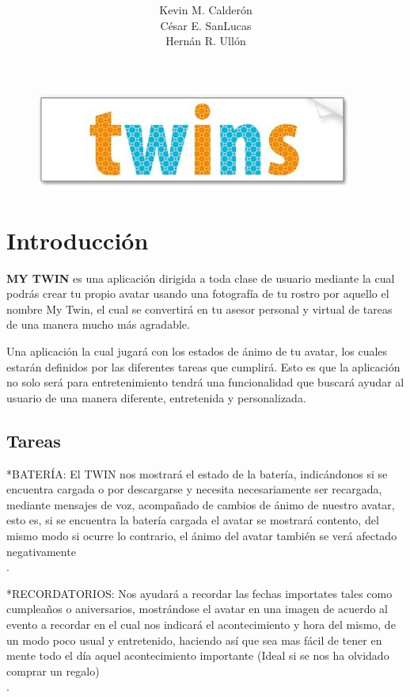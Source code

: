 \documentclass[12pt]{article}
\title{{\LARGE \textbf{\color{blue}{MY TWIN}}}}
\author{Kevin M. Calder\'on\\C\'esar E. SanLucas\\Hern\'an R. Ull\'on}
\date{}
\begin{document}
\maketitle

\begin{figure}[h]
\centering
\includegraphics[scale=0.5]{LTwins}     %
\end{figure}

\newpage
\section{Introducción} 

\textbf{MY TWIN} es una aplicación dirigida a toda clase de usuario mediante la cual podrás crear tu propio avatar usando una fotografía de tu rostro por aquello el nombre My Twin, el cual se convertirá en tu asesor personal y virtual de tareas de una manera mucho más agradable. 

Una aplicación la cual jugará con los estados de ánimo de tu avatar, los cuales estarán definidos por las diferentes tareas que cumplirá. Esto es que la aplicación no solo será para entretenimiento tendrá una funcionalidad que buscará ayudar al usuario de una manera diferente, entretenida y personalizada.\\
\subsection{Tareas} 

\hspace{0.2in}*BATERÍA: El TWIN  nos  mostrará el estado de la batería, indicándonos si se encuentra cargada o por descargarse y necesita necesariamente ser recargada, mediante mensajes de voz, acompañado de cambios de ánimo de nuestro avatar, esto es, si se encuentra la batería cargada el avatar se mostrará contento, del mismo modo si ocurre lo contrario, el ánimo del avatar también se verá afectado negativamente\\. 

\hspace{0.2in}*RECORDATORIOS: Nos ayudará a recordar las fechas importates tales como cumpleaños o aniversarios, mostrándose el avatar en una imagen de acuerdo al evento a recordar en el cual nos indicará el acontecimiento y hora del mismo, de un modo poco usual y entretenido, haciendo así que sea mas fácil de tener en mente todo el día aquel acontecimiento importante (Ideal si se nos ha olvidado comprar un regalo)\\. 
\end{document}
